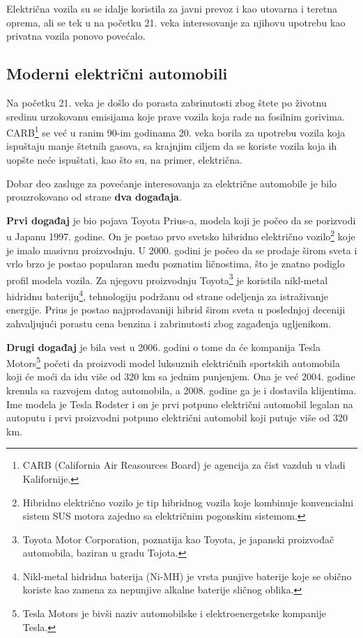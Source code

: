 \documentclass[a4paper]{article}
\begin{document}
Električna vozila su se idalje koristila za javni prevoz i kao utovarna i teretna oprema, ali se tek u na početku 21. veka interesovanje za njihovu upotrebu kao privatna vozila ponovo povećalo.


\subsection{Moderni električni automobili}
\label{subsec:podnaslov2}


Na početku 21. veka je došlo do porasta zabrinutosti zbog štete po životnu sredinu urzokovanu emisijama koje prave vozila koja rade na fosilnim gorivima. CARB\footnote{CARB (California Air Reasources Board) je agencija za čist vazduh u vladi Kalifornije.} se već u ranim 90-im godinama 20. veka borila za upotrebu vozila koja ispuštaju manje štetnih gasova, sa krajnjim ciljem da se koriste vozila koja ih uopšte neće ispuštati, kao što su, na primer, električna.

Dobar deo zasluge za povećanje interesovanja za električne automobile je bilo prouzrokovano od strane \textbf{dva događaja}.

\textbf{Prvi događaj} je bio pojava Toyota Prius-a, modela koji je počeo da se porizvodi u Japanu 1997. godine. On je postao prvo svetsko hibridno električno vozilo\footnote{Hibridno električno vozilo je tip hibridnog vozila koje kombinuje konvencialni sistem SUS motora zajedno sa električnim pogonskim sistemom.} koje je imalo masivnu proizvodnju. U 2000. godini je počeo da se prodaje širom sveta i vrlo brzo je postao popularan među poznatim ličnostima, što je znatno podiglo profil modela vozila. Za njegovu proizvodnju Toyota\footnote{Toyota Motor Corporation, poznatija kao Toyota, je japanski proizvođač automobila, baziran u gradu Tojota.} je koristila nikl-metal hidridnu bateriju\footnote{Nikl-metal hidridna baterija (Ni-MH) je vrsta punjive baterije koje se obično koriste kao zamena za nepunjive alkalne baterije sličnog oblika.}, tehnologiju podržanu od strane odeljenja za istraživanje energije. Prius je postao najprodavaniji hibrid širom sveta u poslednjoj deceniji zahvaljujući porastu cena benzina i zabrinutosti zbog zagađenja ugljenikom.

\textbf{Drugi događaj} je bila vest u 2006. godini o tome da će kompanija Tesla Motors\footnote{Tesla Motors je bivši naziv automobilske i elektroenergetske kompanije Tesla.} početi da proizvodi model luksuznih električnih sportskih automobila koji će moći da idu više od 320 km sa jednim punjenjem. Ona je već 2004. godine krenula  sa razvojem datog automobila, a 2008. godine ga je i dostavila klijentima. Ime modela je Tesla Rodster i on je prvi potpuno električni automobil legalan na autoputu i prvi proizvodni potpuno električni automobil koji putuje više od 320 km.
\end{document}
